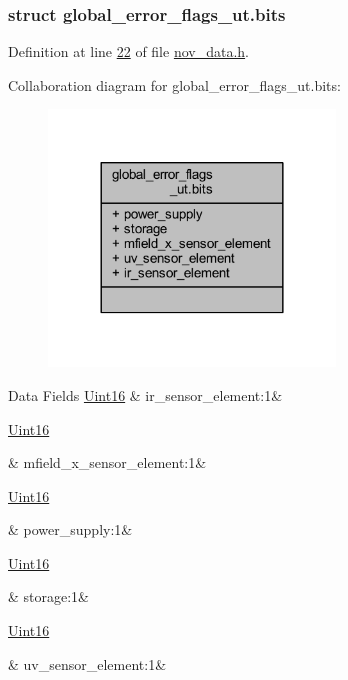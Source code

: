 \subsubsection{struct global\+\_\+error\+\_\+flags\+\_\+ut.\+bits}


Definition at line \hyperlink{a00022_source_l00022}{22} of file \hyperlink{a00022_source}{nov\+\_\+data.\+h}.



Collaboration diagram for global\+\_\+error\+\_\+flags\+\_\+ut.\+bits\+:\nopagebreak
\begin{figure}[H]
\begin{center}
\leavevmode
\includegraphics[width=216pt]{db/d20/a00980}
\end{center}
\end{figure}
\begin{DoxyFields}{Data Fields}
\hypertarget{a00022_a660d9342b0a83c1a03b3082c4a110465}{\hyperlink{a00072_a59a9f6be4562c327cbfb4f7e8e18f08b}{Uint16}}\label{a00022_a660d9342b0a83c1a03b3082c4a110465}
&
ir\+\_\+sensor\+\_\+element\+:1&
\\
\hline

\hypertarget{a00022_ae47f53b8f1a226d4fed0b0d7f81b9a1e}{\hyperlink{a00072_a59a9f6be4562c327cbfb4f7e8e18f08b}{Uint16}}\label{a00022_ae47f53b8f1a226d4fed0b0d7f81b9a1e}
&
mfield\+\_\+x\+\_\+sensor\+\_\+element\+:1&
\\
\hline

\hypertarget{a00022_a5b707c19ace588b0304807d6fff7b0d5}{\hyperlink{a00072_a59a9f6be4562c327cbfb4f7e8e18f08b}{Uint16}}\label{a00022_a5b707c19ace588b0304807d6fff7b0d5}
&
power\+\_\+supply\+:1&
\\
\hline

\hypertarget{a00022_addecebdea58b5f264d27f1f7909bab74}{\hyperlink{a00072_a59a9f6be4562c327cbfb4f7e8e18f08b}{Uint16}}\label{a00022_addecebdea58b5f264d27f1f7909bab74}
&
storage\+:1&
\\
\hline

\hypertarget{a00022_a3020e09312bbf84a097b774fe0a187cd}{\hyperlink{a00072_a59a9f6be4562c327cbfb4f7e8e18f08b}{Uint16}}\label{a00022_a3020e09312bbf84a097b774fe0a187cd}
&
uv\+\_\+sensor\+\_\+element\+:1&
\\
\hline

\end{DoxyFields}
\label{d4/dd7/a00793}
\hypertarget{a00022_d4/dd7/a00793}{}
